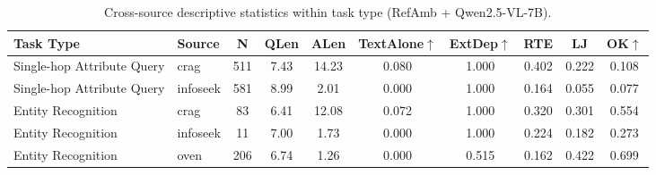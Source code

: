 \begin{table}[htbp]
    \centering
    \caption{Cross-source descriptive statistics within task type (RefAmb + Qwen2.5-VL-7B).}
    \setlength{\tabcolsep}{3pt}
    \begin{tabular}{llcccccccc}
    \hline
    Task Type & Source & N & QLen & ALen & TextAlone$\uparrow$ & ExtDep$\uparrow$ & RTE & LJ & OK$\uparrow$ \\
    \hline
    Single-hop Attribute Query & crag & 511 & 7.43 & 14.23 & 0.080 & 1.000 & 0.402 & 0.222 & 0.108 \\
    Single-hop Attribute Query & infoseek & 581 & 8.99 & 2.01 & 0.000 & 1.000 & 0.164 & 0.055 & 0.077 \\
    Entity Recognition & crag & 83 & 6.41 & 12.08 & 0.072 & 1.000 & 0.320 & 0.301 & 0.554 \\
    Entity Recognition & infoseek & 11 & 7.00 & 1.73 & 0.000 & 1.000 & 0.224 & 0.182 & 0.273 \\
    Entity Recognition & oven & 206 & 6.74 & 1.26 & 0.000 & 0.515 & 0.162 & 0.422 & 0.699 \\
    \hline
    \end{tabular}
    \label{tab:cross_source_consistency_desc}
\end{table}
